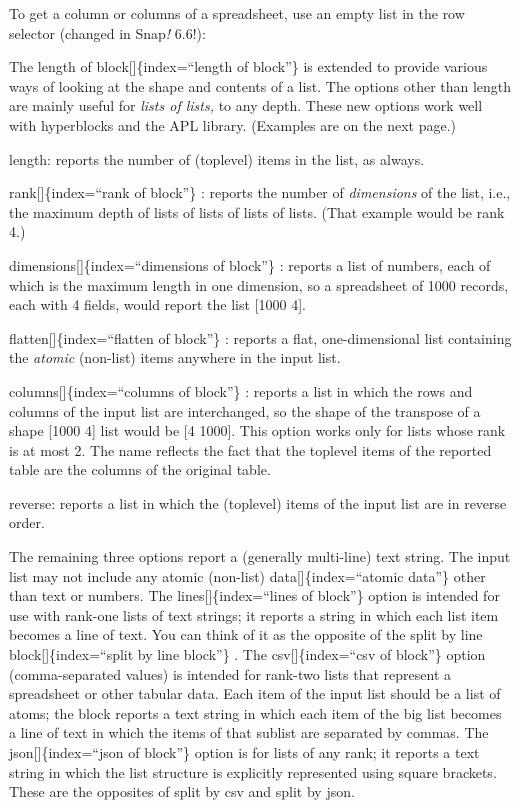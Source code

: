 \documentclass[
  letterpaper,
]{book}
\begin{document}
To get a column or columns of a spreadsheet, use an empty list in the
row selector (changed in Snap\emph{!} 6.6!):

The length of block{[}{]}\{index=``length of block''\} is extended to
provide various ways of looking at the shape and contents of a list. The
options other than length are mainly useful for \emph{lists of lists,}
to any depth. These new options work well with hyperblocks and the APL
library. (Examples are on the next page.)

length: reports the number of (toplevel) items in the list, as always.

rank{[}{]}\{index=``rank of block''\} : reports the number of
\emph{dimensions} of the list, i.e., the maximum depth of lists of lists
of lists of lists. (That example would be rank 4.)

dimensions{[}{]}\{index=``dimensions of block''\} : reports a list of
numbers, each of which is the maximum length in one dimension, so a
spreadsheet of 1000 records, each with 4 fields, would report the list
{[}1000 4{]}.

flatten{[}{]}\{index=``flatten of block''\} : reports a flat,
one-dimensional list containing the \emph{atomic} (non-list) items
anywhere in the input list.

columns{[}{]}\{index=``columns of block''\} : reports a list in which
the rows and columns of the input list are interchanged, so the shape of
the transpose of a shape {[}1000 4{]} list would be {[}4 1000{]}. This
option works only for lists whose rank is at most 2. The name reflects
the fact that the toplevel items of the reported table are the columns
of the original table.

reverse: reports a list in which the (toplevel) items of the input list
are in reverse order.

The remaining three options report a (generally multi-line) text string.
The input list may not include any atomic (non-list)
data{[}{]}\{index=``atomic data''\} other than text or numbers. The
lines{[}{]}\{index=``lines of block''\} option is intended for use with
rank-one lists of text strings; it reports a string in which each list
item becomes a line of text. You can think of it as the opposite of the
split by line block{[}{]}\{index=``split by line block''\} . The
csv{[}{]}\{index=``csv of block''\} option (comma-separated values) is
intended for rank-two lists that represent a spreadsheet or other
tabular data. Each item of the input list should be a list of atoms; the
block reports a text string in which each item of the big list becomes a
line of text in which the items of that sublist are separated by commas.
The json{[}{]}\{index=``json of block''\} option is for lists of any
rank; it reports a text string in which the list structure is explicitly
represented using square brackets. These are the opposites of split by
csv and split by json.
\end{document}
